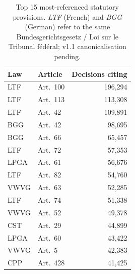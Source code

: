 \begin{table}[H]
\centering
\caption{Top 15 most-referenced statutory provisions. \emph{LTF} (French) and \emph{BGG} (German) refer to the same Bundesgerichtsgesetz / Loi sur le Tribunal f\'ed\'eral; v1.1 canonicalisation pending.}
\label{tab:top_statutes}
\small
\begin{tabular}{l l r}
\toprule
\textbf{Law} & \textbf{Article} & \textbf{Decisions citing} \\
\midrule
LTF & Art.\ 100 & 196,294 \\
LTF & Art.\ 113 & 113,308 \\
LTF & Art.\ 42 & 109,891 \\
BGG & Art.\ 42 & 98,695 \\
BGG & Art.\ 66 & 65,457 \\
LTF & Art.\ 72 & 57,353 \\
LPGA & Art.\ 61 & 56,676 \\
LTF & Art.\ 82 & 54,760 \\
VWVG & Art.\ 63 & 52,285 \\
LTF & Art.\ 74 & 51,338 \\
VWVG & Art.\ 52 & 49,378 \\
CST & Art.\ 29 & 44,899 \\
LPGA & Art.\ 60 & 43,422 \\
VWVG & Art.\ 5 & 42,383 \\
CPP & Art.\ 428 & 41,425 \\
\bottomrule
\end{tabular}
\end{table}
